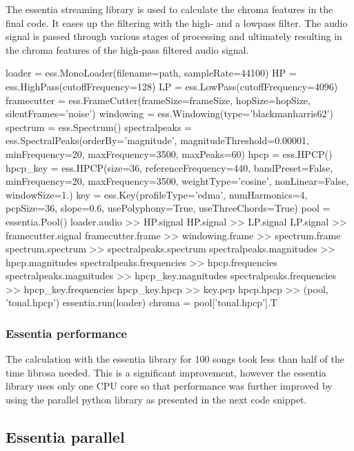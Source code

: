 The essentia streaming library is used to calculate the chroma features in the final code. It eases up the filtering with the high- and a lowpass filter. The audio signal is passed through various stages of processing and ultimately resulting in the chroma features of the high-pass filtered audio signal. 
\begin{pythonCode}
loader = ess.MonoLoader(filename=path, sampleRate=44100)
HP = ess.HighPass(cutoffFrequency=128)
LP = ess.LowPass(cutoffFrequency=4096)
framecutter = ess.FrameCutter(frameSize=frameSize, hopSize=hopSize, silentFrames='noise')
windowing = ess.Windowing(type='blackmanharris62')
spectrum = ess.Spectrum()
spectralpeaks = ess.SpectralPeaks(orderBy='magnitude', magnitudeThreshold=0.00001, 
	minFrequency=20, maxFrequency=3500, maxPeaks=60)
hpcp = ess.HPCP()
hpcp_key = ess.HPCP(size=36, referenceFrequency=440, bandPreset=False, minFrequency=20,
	maxFrequency=3500, weightType='cosine', nonLinear=False, windowSize=1.)
key = ess.Key(profileType='edma', numHarmonics=4, pcpSize=36, slope=0.6, 
	usePolyphony=True, useThreeChords=True)
pool = essentia.Pool()
loader.audio >> HP.signal
HP.signal >> LP.signal
LP.signal >> framecutter.signal    
framecutter.frame >> windowing.frame >> spectrum.frame
spectrum.spectrum >> spectralpeaks.spectrum
spectralpeaks.magnitudes >> hpcp.magnitudes
spectralpeaks.frequencies >> hpcp.frequencies
spectralpeaks.magnitudes >> hpcp_key.magnitudes
spectralpeaks.frequencies >> hpcp_key.frequencies
hpcp_key.hpcp >> key.pcp
hpcp.hpcp >> (pool, 'tonal.hpcp')
essentia.run(loader)
chroma = pool['tonal.hpcp'].T
\end{pythonCode}	

\subsubsection{Essentia performance}

The calculation with the essentia library for 100 songs took less than half of the time librosa needed. This is a significant improvement, however the essentia library uses only one CPU core so that performance was further improved by using the parallel python library as presented in the next code snippet.

\subsection{Essentia parallel}


